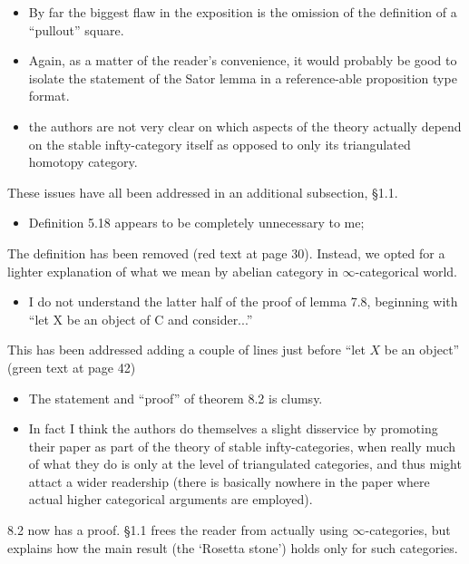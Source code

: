 \documentclass{article}
\begin{document}
 \begin{itemize}
  \item By far the biggest flaw in the exposition is the omission of the definition of a “pullout” square.
  \item Again, as a matter of the reader’s convenience, it would probably be
  good to isolate the statement of the Sator lemma in a reference-able
  proposition type format.
  \item the authors are not very clear on which aspects of
  the theory actually depend on the stable infty-category itself as opposed
  to only its triangulated homotopy category. 
 \end{itemize}
 These issues have all been addressed in an additional subsection, §1.1.
 \begin{itemize}
  \item Definition 5.18 appears to be completely unnecessary to me;
 \end{itemize}
 The definition has been removed (red text at page 30). Instead, we opted for a lighter explanation of what we mean by abelian category in $\infty$-categorical world.
 \begin{itemize}
  \item I do not understand the latter half of the proof of lemma 7.8, beginning
  with “let X be an object of C and consider...”
 \end{itemize}
 This has been addressed adding a couple of lines just before ``let $X$ be an object'' (green text at page 42)
 \begin{itemize}
  \item The statement and “proof” of theorem 8.2 is clumsy.
  \item In fact I think the authors do themselves a slight disservice by promoting their paper as part of the theory of stable infty-categories, when really
  much of what they do is only at the level of triangulated categories,
  and thus might attact a wider readership (there is basically nowhere in
  the paper where actual higher categorical arguments are employed).
 \end{itemize}
 8.2 now has a proof. §1.1 frees the reader from actually using $\infty$-categories, but explains how the main result (the `Rosetta stone') holds only for such categories.
\end{document}
